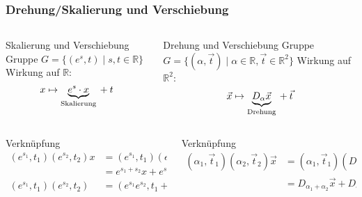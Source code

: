 %
%
%
\bgroup
\begin{frame}[t]
\setlength{\abovedisplayskip}{5pt}
\setlength{\belowdisplayskip}{5pt}
\frametitle{Drehung/Skalierung und Verschiebung}
\vspace{-20pt}
\begin{columns}[t,onlytextwidth]
\begin{column}{0.48\textwidth}
\begin{block}{Skalierung und Verschiebung}
Gruppe $G=\{(e^s,t)\;|\;s,t\in\mathbb{R}\}$
\\
Wirkung auf $\mathbb{R}$:
\[
x\mapsto \underbrace{e^s\cdot x}_{\text{Skalierung}} \mathstrut+ t
\]
\end{block}
\end{column}
\begin{column}{0.48\textwidth}
\begin{block}{Drehung und Verschiebung}
Gruppe
$G=
\{ (\alpha,\vec{t})
\;|\;
\alpha\in\mathbb{R},\vec{t}\in\mathbb{R}^2
\}$
Wirkung auf $\mathbb{R}^2$:
\[
\vec{x}\mapsto \underbrace{D_\alpha \vec{x}}_{\text{Drehung}} \mathstrut+ \vec{t}
\]
\end{block}
\end{column}
\end{columns}
\vspace{-15pt}
\begin{columns}[t,onlytextwidth]
\begin{column}{0.48\textwidth}
\begin{block}{Verknüpfung}
\vspace{-15pt}
\begin{align*}
(e^{s_1},t_1)(e^{s_2},t_2)x
&=
(e^{s_1},t_1)(e^{s_2}x+t_2)
\\
&=
e^{s_1+s_2}x + e^{s_1}t_2+t_1
\\
(e^{s_1},t_1)(e^{s_2},t_2)
&=
(e^{s_1}e^{s_2},t_1+e^{s_1}t_2)
\end{align*}
\end{block}
\end{column}
\begin{column}{0.48\textwidth}
\begin{block}{Verknüpfung}
\vspace{-15pt}
\begin{align*}
(\alpha_1,\vec{t}_1)
(\alpha_2,\vec{t}_2)
\vec{x}
&=
(\alpha_1,\vec{t}_1)(D_{\alpha_2}\vec{x}+\vec{t}_2)
\\
&=D_{\alpha_1+\alpha_2}\vec{x} + D_{\alpha_1}\vec{t}_2+\vec{t}_1

\end{align*}
\end{block}
\end{column}
\end{columns}
\end{frame}
